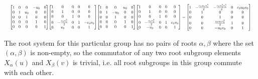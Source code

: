 \documentclass[11pt]{article}
\theoremstyle{definition}
\begin{document}
\[
\scaletoalign{\textwidth}{{\left[\begin{matrix}1 & 0 & 0 & - u_{0} & 0\\0 & 1 & u_{0} & 0 & 0\\0 & 0 & 1 & 0 & 0\\0 & 0 & 0 & 1 & 0\\0 & 0 & 0 & 0 & 1\end{matrix}\right]} {\left[\begin{matrix}1 & 0 & 0 & 0 & 0\\0 & 1 & 0 & 0 & 0\\0 & 0 & 1 & 0 & 0\\0 & - \frac{c_{0} v_{0}^{2}}{2} & 0 & 1 & - c_{0} v_{0}\\0 & v_{0} & 0 & 0 & 1\end{matrix}\right]} {\left[\begin{matrix}1 & 0 & 0 & u_{0} & 0\\0 & 1 & - u_{0} & 0 & 0\\0 & 0 & 1 & 0 & 0\\0 & 0 & 0 & 1 & 0\\0 & 0 & 0 & 0 & 1\end{matrix}\right]} {\left[\begin{matrix}1 & 0 & 0 & 0 & 0\\0 & 1 & 0 & 0 & 0\\0 & 0 & 1 & 0 & 0\\0 & - \frac{c_{0} v_{0}^{2}}{2} & 0 & 1 & c_{0} v_{0}\\0 & - v_{0} & 0 & 0 & 1\end{matrix}\right]} = {\left[\begin{matrix}1 & - \frac{c_{0} u_{0} v_{0}^{2}}{2} & - \frac{c_{0} u_{0}^{2} v_{0}^{2}}{2} & 0 & c_{0} u_{0} v_{0}\\0 & 1 & 0 & 0 & 0\\0 & 0 & 1 & 0 & 0\\0 & 0 & \frac{c_{0} u_{0} v_{0}^{2}}{2} & 1 & 0\\0 & 0 & - u_{0} v_{0} & 0 & 1\end{matrix}\right]}}
\]


\else
The root system for this particular group has no pairs of roots $\alpha, \beta$ where the set $(\alpha, \beta)$ is non-empty, so the commutator of any two root subgroup elements $X_\alpha(u)$ and $X_\beta(v)$ is trivial, i.e. all root subgroups in this group commute with each other.
\fi
\end{document}
